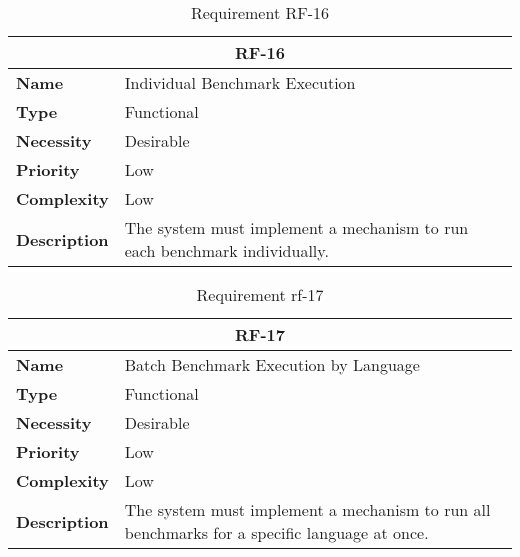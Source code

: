 \begin{table}[H]
    \centering
    \begin{tabular}{l p{10cm}}
        \toprule
        \multicolumn{2}{c}{\textbf{RF-16}} \\
        \toprule
        \textbf{Name}               & Individual Benchmark Execution \\
        \textbf{Type}               & Functional \\
        \textbf{Necessity}          & Desirable \\
        \textbf{Priority}           & Low \\
        \textbf{Complexity}         & Low \\
        \textbf{Description}        & The system must implement a mechanism to run each benchmark individually. \\
        \bottomrule
    \end{tabular}
\caption{Requirement RF-16}\label{tab:rf-16}
\end{table}

\begin{table}[H]
    \centering
    \begin{tabular}{l p{10cm}}
        \toprule
        \multicolumn{2}{c}{\textbf{RF-17}} \\
        \toprule
        \textbf{Name}               & Batch Benchmark Execution by Language \\
        \textbf{Type}               & Functional \\
        \textbf{Necessity}          & Desirable \\
        \textbf{Priority}           & Low \\
        \textbf{Complexity}         & Low \\
        \textbf{Description}        & The system must implement a mechanism to run all benchmarks for a specific language at once. \\
        \bottomrule
    \end{tabular}
\caption{Requirement rf-17}\label{tab:rf-17}
\end{table}

